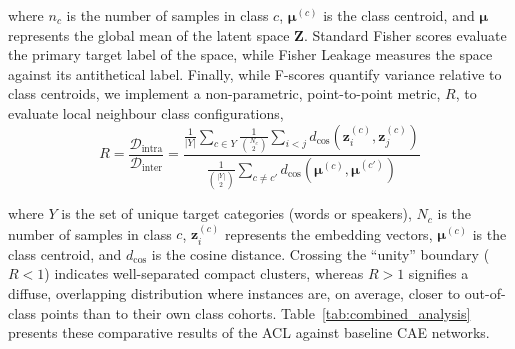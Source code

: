 \documentclass[conference,letterpaper]{IEEEtran}
\begin{document}
    
\noindent where $n_c$ is the number of samples in class $c$, $\boldsymbol{\mu}^{(c)}$ is the class centroid, and $\boldsymbol{\mu}$ represents the global mean of the latent space $\boldsymbol{Z}$. Standard Fisher scores evaluate the primary target label of the space, while Fisher Leakage measures the space against its antithetical label. Finally, while F-scores quantify variance relative to class centroids, we implement a non-parametric, point-to-point metric, $R$, to evaluate local neighbour class configurations,
\vspace{-0.5cm}
    \begin{equation}
        \label{eq:intra_inter_ratio}
        R = \frac{\mathcal{D}_{\text{intra}}}{\mathcal{D}_{\text{inter}}} = \frac{\displaystyle \frac{1}{|Y|} \sum_{c \in Y} \frac{1}{\binom{N_c}{2}} \sum_{i < j} d_{\text{cos}}\left(\mathbf{z}_i^{(c)}, \mathbf{z}_j^{(c)}\right)}{\displaystyle \frac{1}{\binom{|Y|}{2}} \sum_{c \neq c'} d_{\text{cos}}\left(\boldsymbol{\mu}^{(c)}, \boldsymbol{\mu}^{(c')}\right)}
    \end{equation}
\vspace{-0.5cm}
    
\noindent where $Y$ is the set of unique target categories (words or speakers), $N_c$ is the number of samples in class $c$, $\mathbf{z}_i^{(c)}$ represents the embedding vectors, $\boldsymbol{\mu}^{(c)}$ is the class centroid, and $d_{\text{cos}}$ is the cosine distance. Crossing the ``unity'' boundary ($R < 1$) indicates well-separated compact clusters, whereas $R > 1$ signifies a diffuse, overlapping distribution where instances are, on average, closer to out-of-class points than to their own class cohorts. Table~\ref{tab:combined_analysis} presents these comparative results of the ACL against baseline CAE networks.
\end{document}
